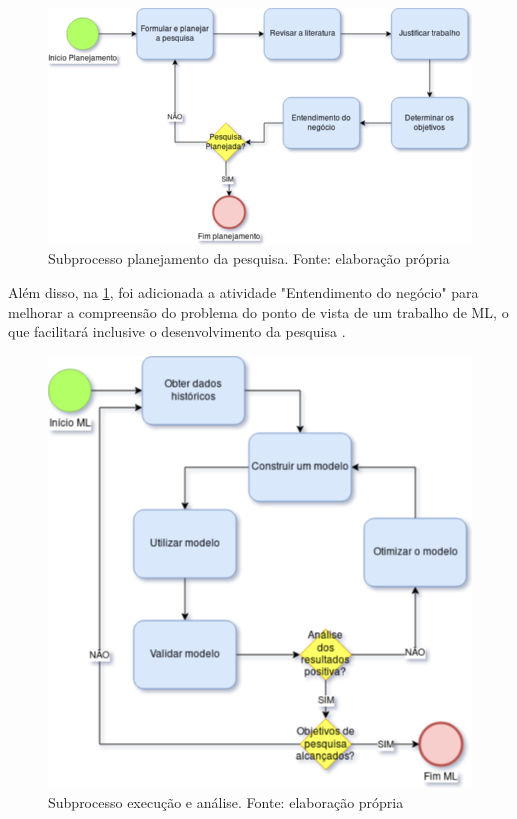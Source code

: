 \begin{figure}[h]
	\centering
    \includegraphics[keepaspectratio=true,scale=0.5]{figuras/subprocessoPlanejamento}
	\caption[Subprocesso planejamento da pesquisa]{Subprocesso planejamento da pesquisa. Fonte: elaboração própria}
	\label{fig:subprocessoPlanejamento}
\end{figure}

Além disso, na \ref{fig:subprocessoPlanejamento}, foi adicionada a atividade "Entendimento do negócio" para melhorar a compreensão do problema do ponto de vista de um trabalho de ML, o que facilitará inclusive o desenvolvimento da pesquisa \cite{CROWSTON2017}.

\begin{figure}[h]
	\centering
    \includegraphics[keepaspectratio=true,scale=0.5]{figuras/subprocessoAnalise}
	\caption[Subprocesso execução e análise]{Subprocesso execução e análise. Fonte: elaboração própria}
	\label{fig:subprocessoAnalise}
\end{figure}

